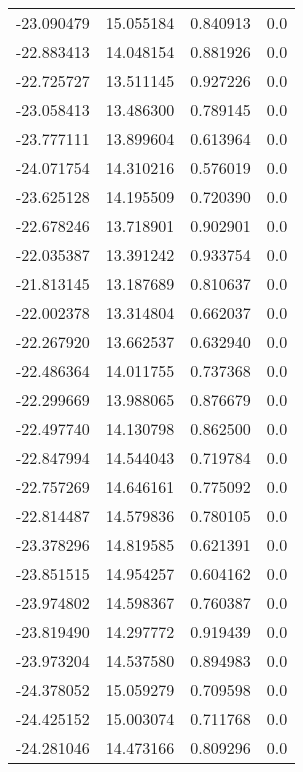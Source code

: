 \begin{tabular}{rrrr}
      -23.090479 &        15.055184 &    0.840913 &   0.0 \\
      -22.883413 &        14.048154 &    0.881926 &   0.0 \\
      -22.725727 &        13.511145 &    0.927226 &   0.0 \\
      -23.058413 &        13.486300 &    0.789145 &   0.0 \\
      -23.777111 &        13.899604 &    0.613964 &   0.0 \\
      -24.071754 &        14.310216 &    0.576019 &   0.0 \\
      -23.625128 &        14.195509 &    0.720390 &   0.0 \\
      -22.678246 &        13.718901 &    0.902901 &   0.0 \\
      -22.035387 &        13.391242 &    0.933754 &   0.0 \\
      -21.813145 &        13.187689 &    0.810637 &   0.0 \\
      -22.002378 &        13.314804 &    0.662037 &   0.0 \\
      -22.267920 &        13.662537 &    0.632940 &   0.0 \\
      -22.486364 &        14.011755 &    0.737368 &   0.0 \\
      -22.299669 &        13.988065 &    0.876679 &   0.0 \\
      -22.497740 &        14.130798 &    0.862500 &   0.0 \\
      -22.847994 &        14.544043 &    0.719784 &   0.0 \\
      -22.757269 &        14.646161 &    0.775092 &   0.0 \\
      -22.814487 &        14.579836 &    0.780105 &   0.0 \\
      -23.378296 &        14.819585 &    0.621391 &   0.0 \\
      -23.851515 &        14.954257 &    0.604162 &   0.0 \\
      -23.974802 &        14.598367 &    0.760387 &   0.0 \\
      -23.819490 &        14.297772 &    0.919439 &   0.0 \\
      -23.973204 &        14.537580 &    0.894983 &   0.0 \\
      -24.378052 &        15.059279 &    0.709598 &   0.0 \\
      -24.425152 &        15.003074 &    0.711768 &   0.0 \\
      -24.281046 &        14.473166 &    0.809296 &   0.0 \\

\end{tabular}

